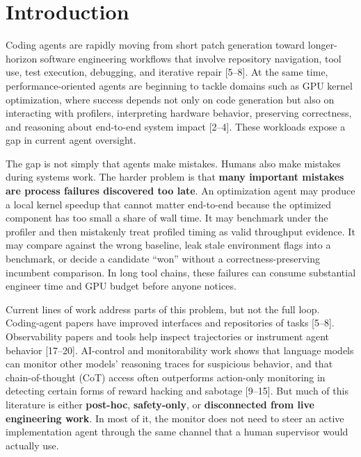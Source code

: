 \documentclass[11pt]{article}
\begin{document}
\begin{abstract}
Our evidence is observational rather than randomized, is not independently annotated, and does not measure monitor cost (token or wall-clock overhead). We therefore do not claim a causal estimate of monitor benefit. The paper's contribution is architectural and empirical-but-observational: for long-horizon coding work, the missing control primitive is often not another offline judge, but a live transcript-native monitor that can force claims through evidence and intervene before bad process compounds.
\end{abstract}

\section{Introduction}

Coding agents are rapidly moving from short patch generation toward longer-horizon software engineering workflows that involve repository navigation, tool use, test execution, debugging, and iterative repair [5--8]. At the same time, performance-oriented agents are beginning to tackle domains such as GPU kernel optimization, where success depends not only on code generation but also on interacting with profilers, interpreting hardware behavior, preserving correctness, and reasoning about end-to-end system impact [2--4]. These workloads expose a gap in current agent oversight.

The gap is not simply that agents make mistakes. Humans also make mistakes during systems work. The harder problem is that \textbf{many important mistakes are process failures discovered too late}. An optimization agent may produce a local kernel speedup that cannot matter end-to-end because the optimized component has too small a share of wall time. It may benchmark under the profiler and then mistakenly treat profiled timing as valid throughput evidence. It may compare against the wrong baseline, leak stale environment flags into a benchmark, or decide a candidate ``won'' without a correctness-preserving incumbent comparison. In long tool chains, these failures can consume substantial engineer time and GPU budget before anyone notices.

Current lines of work address parts of this problem, but not the full loop. Coding-agent papers have improved interfaces and repositories of tasks [5--8]. Observability papers and tools help inspect trajectories or instrument agent behavior [17--20]. AI-control and monitorability work shows that language models can monitor other models' reasoning traces for suspicious behavior, and that chain-of-thought (CoT) access often outperforms action-only monitoring in detecting certain forms of reward hacking and sabotage [9--15]. But much of this literature is either \textbf{post-hoc}, \textbf{safety-only}, or \textbf{disconnected from live engineering work}. In most of it, the monitor does not need to steer an active implementation agent through the same channel that a human supervisor would actually use.
\end{document}
